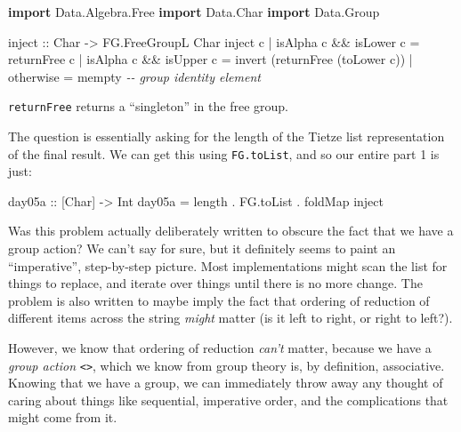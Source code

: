 \documentclass[]{article}
\newenvironment{Shaded}{}{}
\newcommand{\CommentTok}[1]{\textcolor[rgb]{0.38,0.63,0.69}{\textit{#1}}}
\newcommand{\DataTypeTok}[1]{\textcolor[rgb]{0.56,0.13,0.00}{#1}}
\newcommand{\FunctionTok}[1]{\textcolor[rgb]{0.02,0.16,0.49}{#1}}
\newcommand{\KeywordTok}[1]{\textcolor[rgb]{0.00,0.44,0.13}{\textbf{#1}}}
\newcommand{\NormalTok}[1]{#1}
\newcommand{\OperatorTok}[1]{\textcolor[rgb]{0.40,0.40,0.40}{#1}}
\newcommand{\OtherTok}[1]{\textcolor[rgb]{0.00,0.44,0.13}{#1}}
\begin{document}
\begin{Shaded}
\begin{Highlighting}[]
\KeywordTok{import}           \DataTypeTok{Data.Algebra.Free}
\KeywordTok{import}           \DataTypeTok{Data.Char}
\KeywordTok{import}           \DataTypeTok{Data.Group}

\OtherTok{inject ::} \DataTypeTok{Char} \OtherTok{{-}>} \DataTypeTok{FG.FreeGroupL} \DataTypeTok{Char}
\NormalTok{inject c}
    \OperatorTok{|} \FunctionTok{isAlpha}\NormalTok{ c }\OperatorTok{\&\&} \FunctionTok{isLower}\NormalTok{ c }\OtherTok{=}\NormalTok{ returnFree c}
    \OperatorTok{|} \FunctionTok{isAlpha}\NormalTok{ c }\OperatorTok{\&\&} \FunctionTok{isUpper}\NormalTok{ c }\OtherTok{=}\NormalTok{ invert (returnFree (}\FunctionTok{toLower}\NormalTok{ c))}
    \OperatorTok{|} \FunctionTok{otherwise}              \OtherTok{=} \FunctionTok{mempty}       \CommentTok{{-}{-} group identity element}
\end{Highlighting}
\end{Shaded}

\texttt{returnFree} returns a ``singleton'' in the free group.

The question is essentially asking for the length of the Tietze list
representation of the final result. We can get this using \texttt{FG.toList},
and so our entire part 1 is just:

\begin{Shaded}
\begin{Highlighting}[]
\OtherTok{day05a ::}\NormalTok{ [}\DataTypeTok{Char}\NormalTok{] }\OtherTok{{-}>} \DataTypeTok{Int}
\NormalTok{day05a }\OtherTok{=} \FunctionTok{length} \OperatorTok{.}\NormalTok{ FG.toList }\OperatorTok{.} \FunctionTok{foldMap}\NormalTok{ inject}
\end{Highlighting}
\end{Shaded}

Was this problem actually deliberately written to obscure the fact that we have
a group action? We can't say for sure, but it definitely seems to paint an
``imperative'', step-by-step picture. Most implementations might scan the list
for things to replace, and iterate over things until there is no more change.
The problem is also written to maybe imply the fact that ordering of reduction
of different items across the string \emph{might} matter (is it left to right,
or right to left?).

However, we know that ordering of reduction \emph{can't} matter, because we have
a \emph{group action} \texttt{\textless{}\textgreater{}}, which we know from
group theory is, by definition, associative. Knowing that we have a group, we
can immediately throw away any thought of caring about things like sequential,
imperative order, and the complications that might come from it.
\end{document}
